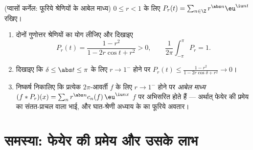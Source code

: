 \begin{exercise}[$\star\star\star$]\label{exo:b2:fourier:12}
(प्वासों कर्नेल: फूरिये श्रेणियों के आबेल माध्य) $0 \leq r <
1$ के लिए $P_r(t) = \sum_{n\in\Z} r^{\abs n}\eu^{\iu nt}$ रखिए।
\begin{enumerate}
  \item दोनों गुणोत्तर श्रेणियों का योग लीजिए और दिखाइए
        \[
        P_r(t) = \frac{1 - r^2}{1 - 2r\cos t + r^2} > 0,
        \qquad
        \frac{1}{2\pi}\int_{-\pi}^{\pi}P_r = 1 .
        \]
  \item दिखाइए कि $\delta \leq \abs t \leq \pi$ के लिए $r \to 1^-$ होने पर  $P_r(t)
        \leq \frac{1 - r^2}{1 - 2r\cos\delta + r^2} \to 0$।
  \item निष्कर्ष निकालिए कि प्रत्येक  $2\pi$-आवर्ती $f$ के लिए $r \to 1^-$ होने
        पर \emph{आबेल माध्य} $(f * P_r)(x) = \sum_n
        r^{\abs n}c_n(f)\,\eu^{\iu nx}$  $f$ पर अभिसरित होते हैं
        --- अर्थात् फेयेर की प्रमेय का संतत-प्राचल वाला भाई, और घात-श्रेणी
        अध्याय के  का फूरिये अवतार।
\end{enumerate}
\end{exercise}

\section{समस्या: फेयेर की प्रमेय और उसके लाभ}

